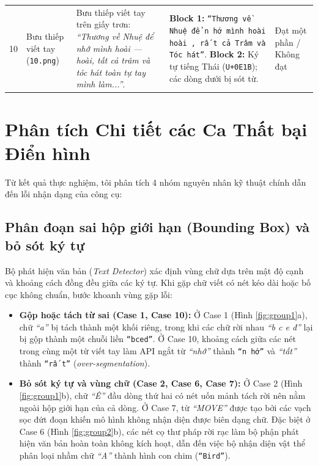 \documentclass[11pt,a4paper]{article}
\begin{document}
{\begin{longtable}{@{}C{0.7cm} L{2.7cm} L{4.6cm} L{5.7cm} C{1.6cm}@{}}
10 & Bưu thiếp viết tay (\texttt{10.png}) &
Bưu thiếp viết tay trên giấy trơn: \textit{``Thương về Nhuệ để nhớ mình hoài --- hoài, tất cả trâm và tóc hát toàn tự tay mình làm...''}. &
\textbf{Block 1:} \texttt{``Thương về Nhuệ để n hớ mình hoài hoài , rấ t cả Trâm và Tóc hát''}. \textbf{Block 2:} Ký tự tiếng Thái (\texttt{U+0E1B}); các dòng dưới bị sót từ. &
Đạt một phần / Không đạt \\
\end{longtable}
}

\section{Phân tích Chi tiết các Ca Thất bại Điển hình}

Từ kết quả thực nghiệm, tôi phân tích 4 nhóm nguyên nhân kỹ thuật chính dẫn đến lỗi nhận dạng của công cụ:

\subsection{Phân đoạn sai hộp giới hạn (Bounding Box) và bỏ sót ký tự}
Bộ phát hiện văn bản (\textit{Text Detector}) xác định vùng chữ dựa trên mật độ cạnh và khoảng cách đồng đều giữa các ký tự. Khi gặp chữ viết có nét kéo dài hoặc bố cục không chuẩn, bước khoanh vùng gặp lỗi:
\begin{itemize}[label=-]
    \item \textbf{Gộp hoặc tách từ sai (Case 1, Case 10):} Ở Case 1 (Hình \ref{fig:group1}a), chữ \textit{``a''} bị tách thành một khối riêng, trong khi các chữ rời nhau \textit{``b c e đ''} lại bị gộp thành một chuỗi liền \texttt{``bced''}. Ở Case 10, khoảng cách giữa các nét trong cùng một từ viết tay làm API ngắt từ \textit{``nhớ''} thành \texttt{``n hớ''} và \textit{``tất''} thành \texttt{``rấ t''} (\textit{over-segmentation}).
    \item \textbf{Bỏ sót ký tự và vùng chữ (Case 2, Case 6, Case 7):} Ở Case 2 (Hình \ref{fig:group1}b), chữ \textit{``Ê''} đầu dòng thứ hai có nét uốn mảnh tách rời nên nằm ngoài hộp giới hạn của cả dòng. Ở Case 7, từ \textit{``MOVE''} được tạo bởi các vạch sọc đứt đoạn khiến mô hình không nhận diện được biên dạng chữ. Đặc biệt ở Case 6 (Hình \ref{fig:group2}b), các nét cọ thư pháp rời rạc làm bộ phận phát hiện văn bản hoàn toàn không kích hoạt, dẫn đến việc bộ nhận diện vật thể phân loại nhầm chữ \textit{``A''} thành hình con chim (\texttt{``Bird''}).
\end{itemize}
\end{document}
